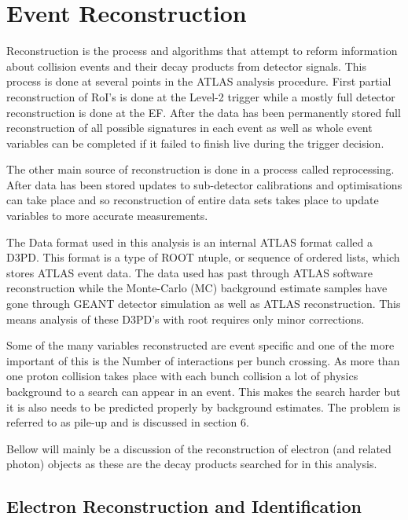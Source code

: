 \chapter{Event Reconstruction}

Reconstruction is the process and algorithms that attempt to reform information about collision events and their decay products from detector signals. This process is done at several points in the ATLAS analysis procedure. First partial reconstruction of RoI's is done at the Level-2 trigger while a mostly full detector reconstruction is done at the EF. After the data has been permanently stored full reconstruction of all possible signatures in each event as well as whole event variables can be completed if it failed to finish live during the trigger decision.

The other main source of reconstruction is done in a process called reprocessing. After data has been stored updates to sub-detector calibrations and optimisations can take place and so reconstruction of entire data sets takes place to update variables to more accurate measurements. 

The Data format used in this analysis is an internal ATLAS format called a D3PD. This format is a type of ROOT \cite{} ntuple, or sequence of ordered lists, which stores ATLAS event data. The data used has past through ATLAS software reconstruction while the Monte-Carlo (MC) background estimate samples have gone through GEANT \cite{} detector simulation as well as ATLAS reconstruction. This means analysis of these D3PD's with root requires only minor corrections.


Some of the many variables reconstructed are event specific and one of the more important of this is the Number of interactions per bunch crossing. As more than one proton collision takes place with each bunch collision a lot of physics background to a search can appear in an event. This makes the search harder but it is also needs to be predicted properly by background estimates. The problem is referred to as pile-up and is discussed in section 6.

Bellow will mainly be a discussion of the reconstruction of electron (and related photon) objects as these are the decay products searched for in this analysis.



\section{Electron Reconstruction and Identification}
\label{sec:ReconElec}

